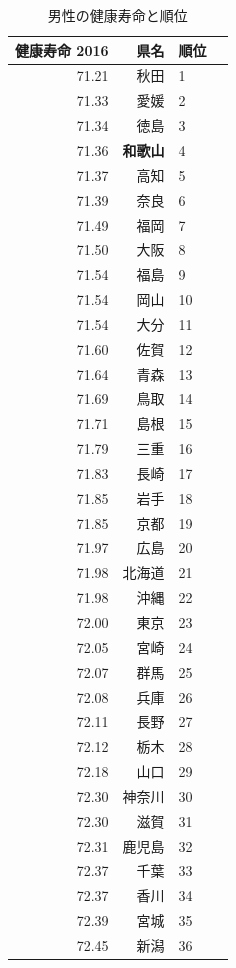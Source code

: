 \begin{table}[ht]
\centering
\footnotesize
\caption{男性の健康寿命と順位}
\begin{tabular}{rrlr}
  \hline
  健康寿命 2016 & 県名 & 順位 \\
  \hline
71.21 & 秋田 &   1 \\
 71.33 & 愛媛 &   2 \\
 71.34 & 徳島 &   3 \\
 71.36 & \textbf{和歌山} &   4 \\
 71.37 & 高知 &   5 \\
 71.39 & 奈良 &   6 \\
 71.49 & 福岡 &   7 \\
 71.50 & 大阪 &   8 \\
 71.54 & 福島 &   9 \\
 71.54 & 岡山 &  10 \\
 71.54 & 大分 &  11 \\
 71.60 & 佐賀 &  12 \\
 71.64 & 青森 &  13 \\
 71.69 & 鳥取 &  14 \\
 71.71 & 島根 &  15 \\
 71.79 & 三重 &  16 \\
 71.83 & 長崎 &  17 \\
 71.85 & 岩手 &  18 \\
 71.85 & 京都 &  19 \\
 71.97 & 広島 &  20 \\
 71.98 & 北海道 &  21 \\
 71.98 & 沖縄 &  22 \\
 72.00 & 東京 &  23 \\
 72.05 & 宮崎 &  24 \\
 72.07 & 群馬 &  25 \\
 72.08 & 兵庫 &  26 \\
 72.11 & 長野 &  27 \\
 72.12 & 栃木 &  28 \\
 72.18 & 山口 &  29 \\
 72.30 & 神奈川 &  30 \\
 72.30 & 滋賀 &  31 \\
 72.31 & 鹿児島 &  32 \\
 72.37 & 千葉 &  33 \\
 72.37 & 香川 &  34 \\
 72.39 & 宮城 &  35 \\
 72.45 & 新潟 &  36 \\

\end{tabular}
\end{table}
